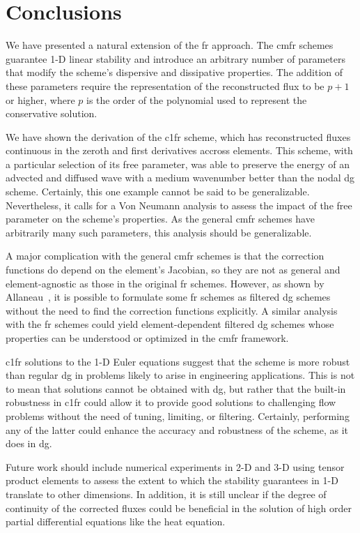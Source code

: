 \section{Conclusions}

We have presented a natural extension of the \gls{fr} approach. The \gls{cmfr} schemes guarantee 1-D linear stability and introduce an arbitrary number of parameters that modify the scheme's dispersive and dissipative properties. The addition of these parameters require the representation of the reconstructed flux to be $p+1$ or higher, where $p$ is the order of the polynomial used to represent the conservative solution.

 We have shown the derivation of the \gls{c1fr} scheme, which has reconstructed fluxes continuous in the zeroth and first derivatives accross elements. This scheme, with a particular selection of its free parameter, was able to preserve the energy of an advected and diffused wave with a medium wavenumber better than the nodal \gls{dg} scheme. Certainly, this one example cannot be said to be generalizable. Nevertheless, it calls for a Von Neumann analysis to assess the impact of the free parameter on the scheme's properties. As the general \gls{cmfr} schemes have arbitrarily many such parameters, this analysis should be generalizable.

A major complication with the general \gls{cmfr} schemes is that the correction functions do depend on the element's Jacobian, so they are not as general and element-agnostic as those in the original \gls{fr} schemes. However, as shown by Allaneau~\cite{allaneau2011connections}, it is possible to formulate some \gls{fr} schemes as filtered \gls{dg} schemes without the need to find the correction functions explicitly. A similar analysis with the \gls{fr} schemes could yield element-dependent filtered \gls{dg} schemes whose properties can be understood or optimized in the \gls{cmfr} framework.

\gls{c1fr} solutions to the 1-D Euler equations suggest that the scheme is more robust than regular \gls{dg} in problems likely to arise in engineering applications. This is not to mean that solutions cannot be obtained with \gls{dg}, but rather that the built-in robustness in \gls{c1fr} could allow it to provide good solutions to challenging flow problems without the need of tuning, limiting, or filtering. Certainly, performing any of the latter could enhance the accuracy and robustness of the scheme, as it does in \gls{dg}.

Future work should include numerical experiments in 2-D and 3-D using tensor product elements to assess the extent to which the stability guarantees in 1-D translate to other dimensions. In addition, it is still unclear if the degree of continuity of the corrected fluxes could be beneficial in the solution of high order partial differential equations like the heat equation.